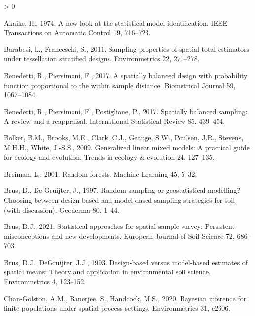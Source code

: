 \documentclass[]{elsarticle} %
\newlength{\cslhangindent}
\newenvironment{CSLReferences}[2] %
 {%
  \setlength{\parindent}{0pt}
  \ifodd #1 \everypar{\setlength{\hangindent}{\cslhangindent}}\ignorespaces\fi
  \ifnum #2 > 0
  \setlength{\parskip}{#2\baselineskip}
  \fi
 }%
 {}
\begin{document}
\hypertarget{refs}{}
\begin{CSLReferences}{1}{0}
\leavevmode\hypertarget{ref-akaike1974new}{}%
Akaike, H., 1974. A new look at the statistical model identification.
IEEE Transactions on Automatic Control 19, 716--723.

\leavevmode\hypertarget{ref-barabesi2011sampling}{}%
Barabesi, L., Franceschi, S., 2011. Sampling properties of spatial total
estimators under tessellation stratified designs. Environmetrics 22,
271--278.

\leavevmode\hypertarget{ref-benedetti2017spatially}{}%
Benedetti, R., Piersimoni, F., 2017. A spatially balanced design with
probability function proportional to the within sample distance.
Biometrical Journal 59, 1067--1084.

\leavevmode\hypertarget{ref-benedetti2017spatiallyreview}{}%
Benedetti, R., Piersimoni, F., Postiglione, P., 2017. Spatially balanced
sampling: A review and a reappraisal. International Statistical Review
85, 439--454.

\leavevmode\hypertarget{ref-bolker2009generalized}{}%
Bolker, B.M., Brooks, M.E., Clark, C.J., Geange, S.W., Poulsen, J.R.,
Stevens, M.H.H., White, J.-S.S., 2009. Generalized linear mixed models:
A practical guide for ecology and evolution. Trends in ecology \&
evolution 24, 127--135.

\leavevmode\hypertarget{ref-breiman2001random}{}%
Breiman, L., 2001. Random forests. Machine Learning 45, 5--32.

\leavevmode\hypertarget{ref-brus1997random}{}%
Brus, D., De Gruijter, J., 1997. Random sampling or geostatistical
modelling? Choosing between design-based and model-dased sampling
strategies for soil (with discussion). Geoderma 80, 1--44.

\leavevmode\hypertarget{ref-brus2021statistical}{}%
Brus, D.J., 2021. Statistical approaches for spatial sample survey:
Persistent misconceptions and new developments. European Journal of Soil
Science 72, 686--703.

\leavevmode\hypertarget{ref-brus1993design}{}%
Brus, D.J., DeGruijter, J.J., 1993. Design-based versus model-based
estimates of spatial means: Theory and application in environmental soil
science. Environmetrics 4, 123--152.

\leavevmode\hypertarget{ref-chan2020bayesian}{}%
Chan-Golston, A.M., Banerjee, S., Handcock, M.S., 2020. Bayesian
inference for finite populations under spatial process settings.
Environmetrics 31, e2606.


\end{CSLReferences}
\end{document}

